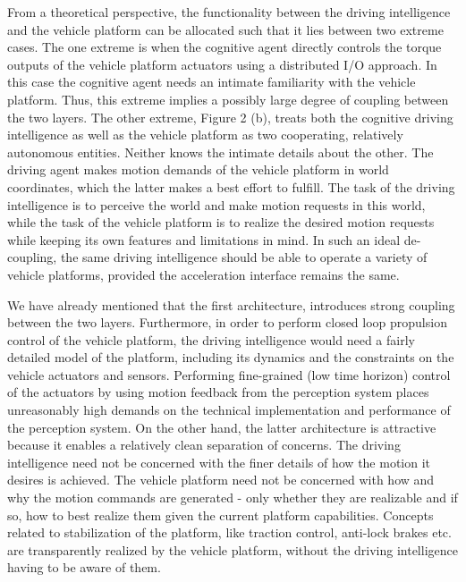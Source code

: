 From a theoretical perspective, the functionality  between the driving intelligence and the vehicle platform can be allocated such that it lies between two extreme cases. The one extreme is when the cognitive agent directly controls the torque outputs of the vehicle platform actuators using a distributed I/O approach. In this case the cognitive agent needs an intimate familiarity with the vehicle platform. Thus, this extreme implies a possibly large degree of coupling between the two layers. The other extreme, Figure 2 (b), treats both the cognitive
driving intelligence as well as the vehicle platform as two cooperating, relatively autonomous entities. Neither knows the intimate details about the other. The driving agent  makes motion demands of the vehicle platform in world coordinates, which the latter makes a best effort to fulfill. The task of the driving intelligence is to perceive the world and make motion requests in this world, while
the task of the vehicle platform is to realize the desired motion requests while keeping its own features and limitations in mind. In such an ideal de-coupling, the same driving intelligence should be able to operate a variety of vehicle platforms, provided the acceleration interface remains the
same.   

We have already mentioned that the first architecture, introduces strong coupling between the two layers. Furthermore, in order to perform closed loop propulsion control of the vehicle platform, the driving intelligence would need a fairly detailed model of the platform, including its dynamics and the constraints on the vehicle actuators and sensors. Performing fine-grained (low time horizon) control of the actuators by using motion feedback from the perception system places unreasonably high demands on the technical implementation and performance of the perception system. On the other hand, the latter architecture is attractive because it enables a relatively clean separation of concerns. The driving intelligence need not be concerned with the finer details of
how the motion it desires is achieved. The vehicle platform need not be concerned with how and why the motion commands are generated - only whether they are realizable and if so, how to best realize them given the current platform capabilities. Concepts related to stabilization of the platform,
like traction control, anti-lock brakes etc. are transparently realized by the vehicle platform, without the driving intelligence having to be aware of them.

